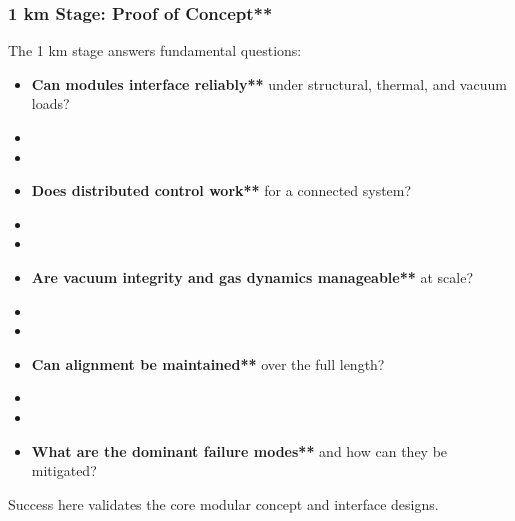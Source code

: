 \subsubsection{1 km Stage: Proof of Concept**}
The 1 km stage answers fundamental questions:
\begin{itemize}
    \item \textbf{Can modules interface reliably**} under structural, thermal, and vacuum loads?
    \item \item \item \textbf{Does distributed control work**} for a connected system?
    \item \item \item \textbf{Are vacuum integrity and gas dynamics manageable**} at scale?
    \item \item \item \textbf{Can alignment be maintained**} over the full length?
    \item \item \item \textbf{What are the dominant failure modes**} and how can they be mitigated?
\end{itemize}
Success here validates the core modular concept and interface designs.

